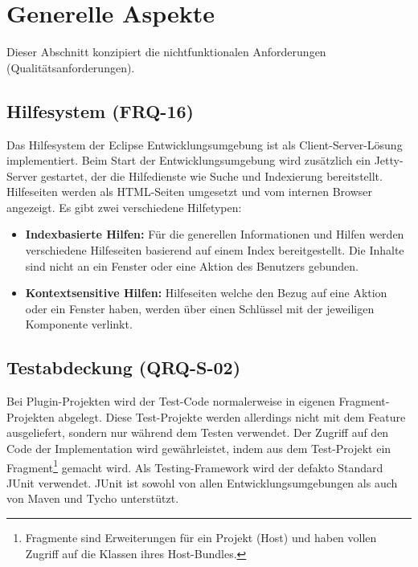 \chapter{Generelle Aspekte}
Dieser Abschnitt konzipiert die nichtfunktionalen Anforderungen (Qualitätsanforderungen).

\section{Hilfesystem (FRQ-16)}\label{hilfesystem}
Das Hilfesystem der Eclipse Entwicklungsumgebung ist als Client-Server-Lösung implementiert. Beim Start der Entwicklungsumgebung wird zusätzlich ein Jetty-Server gestartet, der die Hilfedienste wie Suche und Indexierung bereitstellt.  Hilfeseiten werden als HTML-Seiten umgesetzt und vom internen Browser angezeigt. Es gibt zwei verschiedene Hilfetypen:


\begin{itemize}
\item \textbf{Indexbasierte Hilfen:} Für die generellen Informationen und Hilfen werden verschiedene Hilfeseiten basierend auf einem Index bereitgestellt. Die Inhalte sind nicht an ein Fenster oder eine Aktion des Benutzers gebunden. 
\item \textbf{Kontextsensitive Hilfen:} Hilfeseiten welche den Bezug auf eine Aktion oder ein Fenster haben, werden über einen Schlüssel mit der jeweiligen Komponente verlinkt.
\end{itemize}

\section{Testabdeckung (QRQ-S-02)}\label{testing}
Bei Plugin-Projekten wird der Test-Code normalerweise in eigenen Fragment-Projekten abgelegt. Diese Test-Projekte werden allerdings nicht mit dem Feature ausgeliefert, sondern nur während dem Testen verwendet. Der Zugriff auf den Code der Implementation wird gewährleistet, indem aus dem Test-Projekt ein Fragment\footnote{Fragmente sind Erweiterungen für ein Projekt (Host) und haben vollen Zugriff auf die Klassen ihres Host-Bundles.} gemacht wird. Als Testing-Framework wird der defakto Standard JUnit verwendet. JUnit ist sowohl von allen Entwicklungsumgebungen als auch von Maven und Tycho unterstützt.

